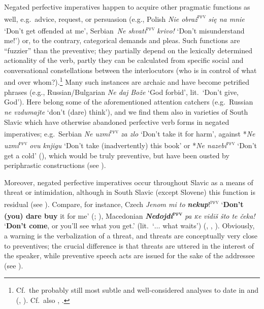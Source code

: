 \documentclass[output=paper,colorlinks,citecolor=brown]{langscibook}
\begin{document}
Negated perfective imperatives happen to acquire other pragmatic functions as well, e.g.\ advice, request, or persuasion (e.g., Polish \textit{Nie obraź}\textsc{\textsuperscript{pfv}} \textit{się na mnie} `Don't get offended at me', Serbian\ \textit{Ne shvati}\textsc{\textsuperscript{pfv}} \textit{krivo!} `Don't misunderstand me!') or, to the contrary, categorical demands and pleas. Such functions are ``fuzzier'' than the preventive; they partially depend on the lexically determined actionality of the verb, partly they can be calculated from specific social and conversational constellations between the interlocutors (who is in control of what and over whom?).\footnote{Cf.\ the probably still most subtle and well-considered analyses to date in \citet[101--106]{Holvoet1989} and \citeauthor{Birjulin1992} (\citeyear{Birjulin1992}, \citeyear[\S4]{Birjulin1994}). Cf.\ also \citet[36--37]{Ivić1958}, \citet[22--26]{Laskowski1998}.} Many such instances are archaic and have become petrified phrases (e.g., Russian/Bulgarian \textit{Ne daj Bože} `God forbid', lit.\ `Don't give, God'). Here belong some of the aforementioned attention catchers (e.g.\ Russian \textit{ne vzdumajte} `don't (dare) think'), and we find them also in varieties of South Slavic which have otherwise abandoned perfective verb forms in negated imperatives; e.g.\ Serbian \textit{Ne uzmi}\textsc{\textsuperscript{pfv}} \textit{za zlo} `Don't take it for harm', against *\textit{Ne uzmi}\textsc{\textsuperscript{pfv}} \textit{ovu knjigu} `Don't take (inadvertently) this book' or *\textit{Ne nazebi}\textsuperscript{\textsc{pfv}} `Don't get a cold' (\citealt[27--28]{Ivić1958}), which would be truly preventive, but have been ousted by periphrastic constructions (see ).

Moreover, negated perfective imperatives occur throughout Slavic as a means of threat or intimidation, although in South Slavic (except Slovene) this function is residual (see ). Compare, for instance, Czech \textit{Jenom mi to} \textbf{\textit{nekup}}!\textsuperscript{\textsc{pfv}} `\textbf{Don't (you) dare buy} it for me' (\citealt[28--29]{Ivić1958}; \citealt[60--61]{Kopečný1962}), Macedonian \textbf{\textit{Nedojdi}\textsc{\textsuperscript{pfv}}} \textit{pa} \textit{\textsc{\'k}e} \textit{vidiš što te čeka!} `\textbf{Don't come}, or you'll see what you get.' (lit.\ `$\ldots$ what waits') (\citealt[416]{Koneski1976}, \citealt[346--347]{Tomić2012}, \citealt{Mitkovska2015}).  Obviously, a warning is the verbalization of a threat, and threats are conceptually very close to preventives; the crucial difference is that threats are uttered in the interest of the speaker, while preventive speech acts are issued for the sake of the addressee (see ).
\end{document}
